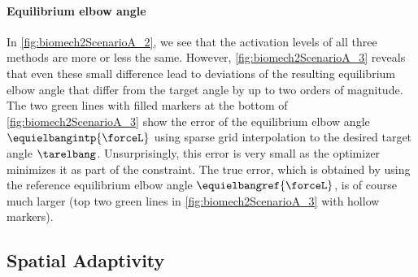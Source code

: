 \paragraph{Equilibrium elbow angle}

In \cref{fig:biomech2ScenarioA_2}, we see that the activation levels
of all three methods are more or less the same.
However, \cref{fig:biomech2ScenarioA_3} reveals that even these small
difference lead to deviations of the resulting equilibrium elbow angle
that differ from the target angle by up to two orders of magnitude.
The two green lines with filled markers at the bottom of
\cref{fig:biomech2ScenarioA_3} show the error of
the equilibrium elbow angle $\equielbangintp{\forceL}$
using sparse grid interpolation to the desired target angle $\tarelbang$.
Unsurprisingly, this error is very small as the optimizer minimizes it
as part of the constraint.
The true error, which is obtained by
using the reference equilibrium elbow angle $\equielbangref{\forceL}$,
is of course much larger
(top two green lines in \cref{fig:biomech2ScenarioA_3}
with hollow markers).



\subsection{Spatial Adaptivity}
\label{sec:734adaptivity}

\dummytext[6]{}
